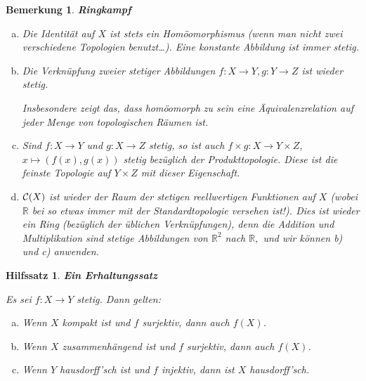 \documentclass[12pt]{scrbook}   %
\newtheorem{bemX}[alles]{Bemerkung}
\newenvironment{bem}[1]{\begin{bemX}{\bf #1}\par\rm}{\end{bemX}}
\newtheorem{hilfsX}[alles]{Hilfssatz}
\newenvironment{hilfs}[1]{\begin{hilfsX}{\bf #1}\par}{\end{hilfsX}}
\begin{document}
\begin{bem}{Ringkampf}
\begin{enumerate}[a)]

\item Die Identität auf $X$ ist stets ein Homöomorphismus (wenn man 
nicht zwei verschiedene Topologien benutzt\dots). Eine konstante Abbildung ist 
immer stetig. 

\item
Die Verknüpfung zweier stetiger Abbildungen $f:X\longrightarrow  Y, 
g:Y\longrightarrow Z$ ist wieder stetig. 

Insbesondere zeigt das, dass homöomorph zu sein eine Äquivalenzrelation
auf jeder Menge von topologischen Räumen ist.

\item
Sind $f:X\longrightarrow Y$ und $g:X\longrightarrow Z$ stetig, so ist auch 
$f\times g:X\longrightarrow Y\times Z$, $x\mapsto (f(x),g(x))$ stetig bezüglich der Produkttopologie.
Diese ist die feinste Topologie auf $Y\times Z$ mit dieser Eigenschaft.

\item

${\cal C}(X)$ ist wieder der Raum  der stetigen reellwertigen Funktionen auf 
$X$ (wobei $\mathbb R$ bei so etwas immer mit der Standardtopologie versehen 
ist!). Dies ist wieder ein Ring (bezüglich der üblichen Verknüpfungen), 
denn die Addition und Multiplikation sind stetige Abbildungen von 
$\mathbb R^2$ nach $\mathbb R,$ und wir können  b) und c) 
anwenden.
\end{enumerate}
\end{bem}



\begin{hilfs} {\bf Ein Erhaltungssatz}\label{Erhaltungssatz}

Es sei $f:X\longrightarrow Y$ stetig. Dann gelten:
\begin{enumerate}[a)]
\item Wenn $X$ kompakt ist und $f$ surjektiv, dann auch $f(X)$.
\item Wenn $X$ zusammenhängend ist und $f$ surjektiv, dann auch $f(X)$.
\item Wenn $Y$ hausdorff'sch ist und $f$ injektiv, dann ist $X$ 
hausdorff'sch.
\end{enumerate}
\end{hilfs}
\end{document}

